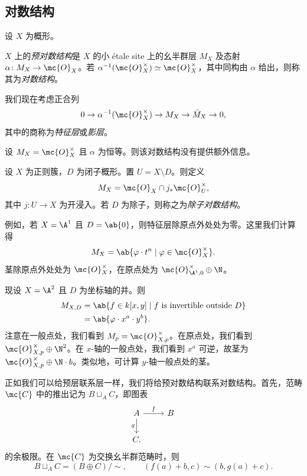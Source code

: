 \subsection{对数结构}%
\label{sub:Log structures}

设 \(X\) 为概形。
\begin{defn}
    \(X\) 上的\textit{预对数结构}是 \(X\) 的小 \'etale site 上的幺半群层 \(M_X\) 及态射 \(\alpha \colon M_X \to \mc{O}_X\)。若 \(\alpha^{-1}(\mc{O}_X^{\times}) \simeq \mc{O}_X^{\times}\)，其中同构由 \(\alpha\) 给出，则称其为\textit{对数结构}。
\end{defn}

我们现在考虑正合列
\[ 0 \to \alpha^{-1}(\mc{O}_X^{\times}) \to M_X \to \bar{M}_X \to 0, \]
其中的商称为\textit{特征层}或\textit{影层}。

\begin{exm}
    设 \(M_X = \mc{O}_X^{\times}\) 且 \(\alpha\) 为恒等。则该对数结构没有提供额外信息。
\end{exm}

\begin{exm}
    设 \(X\) 为正则簇，\(D\) 为闭子概形。置 \(U = X \setminus D\)。则定义
    \[ M_X = \mc{O}_X \cap j_* \mc{O}_U^{\times}, \]
    其中 \(j \colon U \to X\) 为开浸入。若 \(D\) 为除子，则称之为\textit{除子对数结构}。

    例如，若 \(X = \A^1\) 且 \(D = \ab\{0\}\)，则特征层除原点外处处为零。这里我们计算得
    \[ M_X = \ab\{ \varphi \cdot t^n \mid \varphi \in \mc{O}_X^{\times} \}. \]
    茎除原点外处处为 \(\mc{O}_X^{\times}\)，在原点处为 \(\mc{O}_{\A^1, 0}^{\times} \oplus \N\)。
\end{exm}

\begin{exm}
    现设 \(X = \A^2\) 且 \(D\) 为坐标轴的并。则
    \begin{align*}
        M_{X,D} &= \ab\{f \in k[x,y] \mid f \text{ is invertible outside } D \} \\
        &= \ab\{\varphi \cdot x^a \cdot y^b\}.
    \end{align*}
    注意在一般点处，我们看到 \(M_p = \mc{O}_{X,p}^{\times}\)。在原点处，我们看到 \(\mc{O}_{X,p}^{\times}\oplus \N^2\)。在 \(x\)-轴的一般点处，我们看到 \(x^a\) 可逆，故茎为 \(\mc{O}_{X,p}^{\times}\oplus \N \cdot b\)。类似地，可计算 \(y\)-轴一般点处的茎。
\end{exm}

正如我们可以给预层联系层一样，我们将给预对数结构联系对数结构。首先，范畴 \(\mc{C}\) 中的推出记为 \(B \sqcup_A C\)，即图表
\begin{equation*}
\begin{tikzcd}
    A \ar{r}{f} \ar{d}[swap]{g} & B \\
    C.
\end{tikzcd}
\end{equation*}
的余极限。在 \(\mc{C}\) 为交换幺半群范畴时，则
\[ B \sqcup_A C = (B \oplus C)/\sim, \qquad (f(a) + b, c) \sim (b, g(a)+c). \]

